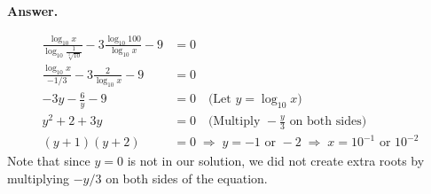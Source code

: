 \documentclass[11pt,letterpaper]{article}
\newcommand{\answer}{\noindent \textbf{Answer. }}
\begin{document}
\answer 

\begin{align*}
    \frac{\log_{10}x}{\log_{10}\frac{1}{\sqrt[3]{10}}} - 3\frac{\log_{10}100}{\log_{10}x} - 9 &= 0\\
    \frac{\log_{10}x}{-1/3} - 3\frac{2}{\log_{10}x} - 9 &= 0\\
    -3y - \frac{6}{y} - 9 &= 0 \quad\text{(Let }y = \log_{10}{x}\text{)}\\
    y^2 + 2 + 3y &= 0 \quad \text{(Multiply }-\frac{y}{3}\text{ on both sides)}\\
    (y+1)(y+2) &= 0 \; \Rightarrow \; y = -1 \text{ or } -2 \; \Rightarrow \; x = 10^{-1} \text{ or } 10^{-2}
\end{align*}
Note that since $y = 0$ is not in our solution, we did not create extra roots by multiplying $-y/3$ on both sides of the equation.
\end{document}
